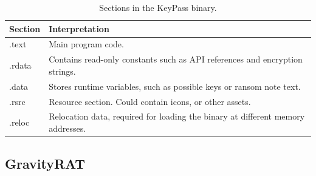 \documentclass{article}
\begin{document}
\begin{table}[H]
  \centering
  \begin{tabular}{|p{2cm}|p{6cm}|}
    \hline
    \textbf{Section} & \textbf{Interpretation} \\
    \hline
    .text & Main program code.\\
    \hline
    .rdata & Contains read-only constants such as API references and encryption strings. \\
    \hline
    .data & Stores runtime variables, such as possible keys or ransom note text. \\
    \hline
    .rsrc & Resource section. Could contain icons, or other assets. \\
    \hline
    .reloc & Relocation data, required for loading the binary at different memory addresses. \\
    \hline
  \end{tabular}
  \caption{Sections in the KeyPass binary.}
  \label{tab:keypass-sections}
\end{table}
 
\subsection{GravityRAT}
\end{document}
